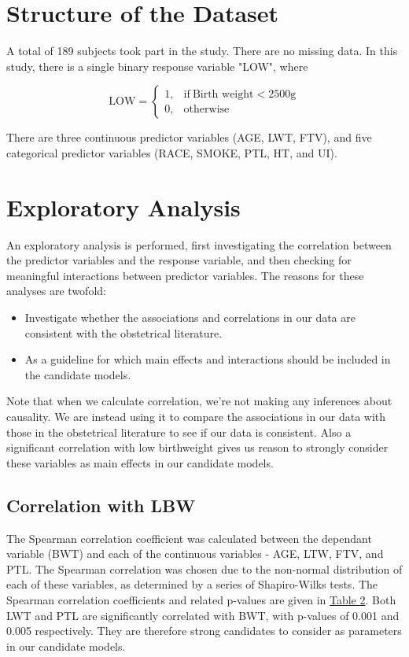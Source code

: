 \section{Structure of the Dataset}
A total of 189 subjects took part in the study. There are no missing data. In this study, there is a single binary response variable "LOW", where

\begin{equation}
    \text{LOW}=
    \begin{cases}
      1, & \text{if}\ \text{Birth weight} < 2500\text{g} \\
      0, & \text{otherwise}
    \end{cases}
\end{equation}

There are three continuous predictor variables (AGE, LWT, FTV), and five categorical predictor variables (RACE, SMOKE, PTL, HT, and UI).

\section{Exploratory Analysis}
An exploratory analysis is performed, first investigating the correlation between the predictor variables and the response variable, and then checking for meaningful interactions between predictor variables. The reasons for these analyses are twofold:
\begin{itemize}
    \item Investigate whether the associations and correlations in our data are consistent with the obstetrical literature.
    \item As a guideline for which main effects and interactions should be included in the candidate models.
\end{itemize}

Note that when we calculate correlation, we're not making any inferences about causality. We are instead using it to compare the associations in our data with those in the obstetrical literature to see if our data is consistent. Also a significant correlation with low birthweight gives us reason to strongly consider these variables as main effects in our candidate models.

\subsection{Correlation with LBW}
The Spearman correlation coefficient was calculated between the dependant variable (BWT) and each of the continuous variables - AGE, LTW, FTV, and PTL. The Spearman correlation was chosen due to the non-normal distribution of each of these variables, as determined by a series of Shapiro-Wilks tests. The Spearman correlation coefficients and related p-values are given in \hyperlink{tab:Spearman}{Table 2}. Both LWT and PTL are significantly correlated with BWT, with p-values of 0.001 and 0.005 respectively. They are therefore strong candidates to consider as parameters in our candidate models.


